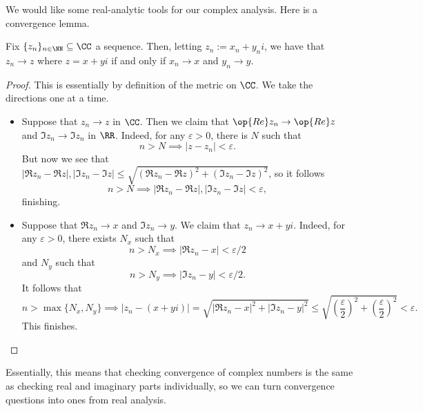 We would like some real-analytic tools for our complex analysis. Here is a convergence lemma.
\begin{lemma} \label{lem:reducetor}
	Fix $\{z_n\}_{n\in\NN}\subseteq\CC$ a sequence. Then, letting $z_n:=x_n+y_ni$, we have that $z_n\to z$ where $z=x+yi$ if and only if $x_n\to x$ and $y_n\to y$.
\end{lemma}
\begin{proof}
	This is essentially by definition of the metric on $\CC$. We take the directions one at a time.
	\begin{itemize}
		\item Suppose that $z_n\to z$ in $\CC$. Then we claim that $\op{Re}z_n\to\op{Re}z$ and $\Im z_n\to\Im z_n$ in $\RR$. Indeed, for any $\varepsilon>0$, there is $N$ such that
		\[n>N\implies|z-z_n|<\varepsilon.\]
		But now we see that $|\Re z_n-\Re z|,|\Im z_n-\Im z|\le\sqrt{(\Re z_n-\Re z)^2+(\Im z_n-\Im z)^2}$, so it follows
		\[n>N\implies|\Re z_n-\Re z|,|\Im z_n-\Im z|<\varepsilon,\]
		finishing.
		\item Suppose that $\Re z_n\to x$ and $\Im z_n\to y$. We claim that $z_n\to x+yi$. Indeed, for any $\varepsilon>0$, there exists $N_x$ such that
		\[n>N_x\implies|\Re z_n-x|<\varepsilon/2\]
		and $N_y$ such that
		\[n>N_y\implies|\Im z_n-y|<\varepsilon/2.\]
		It follows that
		\[n>\max\{N_x,N_y\}\implies|z_n-(x+yi)|=\sqrt{|\Re z_n-x|^2+|\Im z_n-y|^2}\le\sqrt{\left(\frac\varepsilon2\right)^2+\left(\frac\varepsilon2\right)^2}<\varepsilon.\]
		This finishes.
		\qedhere
	\end{itemize}
\end{proof}
Essentially, this means that checking convergence of complex numbers is the same as checking real and imaginary parts individually, so we can turn convergence questions into ones from real analysis.

